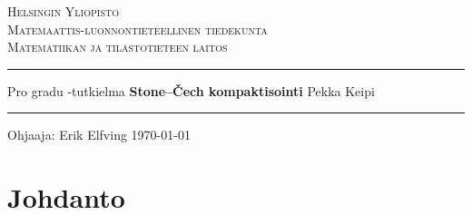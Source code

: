 \documentclass[12pt,a4paper,leqno]{report}
\theoremstyle{plain}
\theoremstyle{definition}
\theoremstyle{remark}
\begin{document}
\begin{titlepage}
  \setlength{\parindent}{0mm}
  \sloppy
  \large \textsc{Helsingin Yliopisto \\
                 Matemaattis-luonnontieteellinen tiedekunta \\
                 Matematiikan ja tilastotieteen laitos}
  \vspace{5mm}
  \hrule height3pt
  \vspace{20mm}
  \begin{center}
    \large Pro gradu -tutkielma
    \linebreak \vfill   
    \huge \textbf{Stone–Čech kompaktisointi}
    \vspace{20mm} \linebreak
    \Large Pekka Keipi \linebreak
    \vfill
  \end{center}
  \hrule height2pt
  \vspace{15mm}
  Ohjaaja: Erik Elfving
  \hfill
  \today
\end{titlepage}

\tableofcontents

\chapter{Johdanto}\label{johd}

\end{document}
